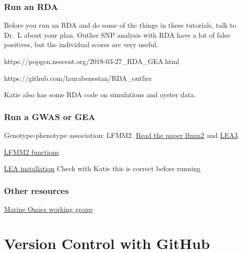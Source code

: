 \documentclass[
  letterpaper,
  DIV=11,
  numbers=noendperiod]{scrreprt}
\begin{document}
\hypertarget{run-an-rda}{%
\subsection*{\texorpdfstring{\textbf{Run an
RDA}}{Run an RDA}}\label{run-an-rda}}

Before you run an RDA and do some of the things in these tutorials, talk
to Dr.~L about your plan. Outlier SNP analysis with RDA have a lot of
false positives, but the individual scores are very useful.

https://popgen.nescent.org/2018-03-27\_RDA\_GEA.html

https://github.com/laurabenestan/RDA\_outlier

Katie also has some RDA code on simulations and oyster data.

\hypertarget{run-a-gwas-or-gea}{%
\subsection*{\texorpdfstring{\textbf{Run a GWAS or
GEA}}{Run a GWAS or GEA}}\label{run-a-gwas-or-gea}}

Genotype-phenotype association: LFMM2.
\href{https://academic.oup.com/mbe/article/36/4/852/5290100}{Read the
paper lfmm2} and
\href{https://onlinelibrary.wiley.com/doi/10.1111/1755-0998.13366}{LEA3}

\href{https://rdrr.io/bioc/LEA/man/lfmm2.html}{LFMM2 functions}

\href{http://www.bioconductor.org/packages/3.3/bioc/html/LEA.html}{LEA
installation} Check with Katie this is correct before running

\hypertarget{other-resources-1}{%
\subsection*{\texorpdfstring{\textbf{Other
resources}}{Other resources}}\label{other-resources-1}}

\href{https://marineomics.github.io/index.html}{Marine Omics working
group}

\hypertarget{version-control-with-github}{%
\chapter{Version Control with
GitHub}\label{version-control-with-github}}
\end{document}
